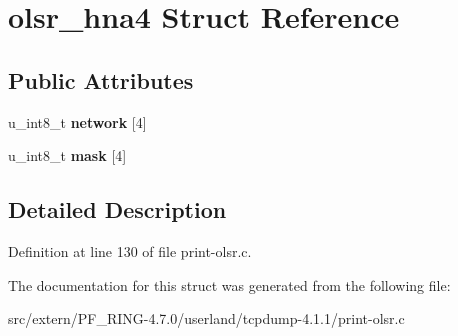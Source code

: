 \hypertarget{structolsr__hna4}{
\section{olsr\_\-hna4 Struct Reference}
\label{structolsr__hna4}
}
\subsection*{Public Attributes}
\begin{DoxyCompactItemize}
\item 
\hypertarget{structolsr__hna4_a5c8a356cf860a36e1ab63b708bc33e44}{
u\_\-int8\_\-t {\bfseries network} \mbox{[}4\mbox{]}}
\label{structolsr__hna4_a5c8a356cf860a36e1ab63b708bc33e44}

\item 
\hypertarget{structolsr__hna4_aede8750855a556d646313585bf78af36}{
u\_\-int8\_\-t {\bfseries mask} \mbox{[}4\mbox{]}}
\label{structolsr__hna4_aede8750855a556d646313585bf78af36}

\end{DoxyCompactItemize}


\subsection{Detailed Description}


Definition at line 130 of file print-\/olsr.c.



The documentation for this struct was generated from the following file:\begin{DoxyCompactItemize}
\item 
src/extern/PF\_\-RING-\/4.7.0/userland/tcpdump-\/4.1.1/print-\/olsr.c\end{DoxyCompactItemize}
